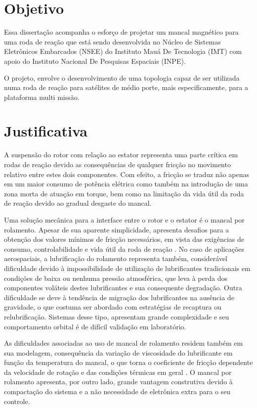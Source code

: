 \section{Objetivo}

Essa dissertação acompanha o esforço de projetar um mancal magnético para uma roda de reação que está sendo desenvolvida no Núcleo de Sistemas Eletrônicos Embarcados (NSEE) do Instituto Mauá De Tecnologia (IMT) com apoio do Instituto Nacional De Pesquisas Espaciais (INPE).

O projeto, envolve o desenvolvimento de uma topologia capaz de ser utilizada numa roda de reação para satélites de médio porte, mais especificamente, para a plataforma multi missão.


\section{Justificativa}

A suspensão do rotor com relação ao estator representa uma parte crítica em rodas de reação \citep{taniwaki2003experimental} devido as consequências de qualquer fricção no movimento relativo entre estes dois componentes. Com efeito, a fricção se traduz não apenas em um maior consumo de potência elétrica como também na introdução de uma zona morta de atuação em torque, bem como na limitação da vida útil da roda de reação devido ao gradual desgaste do mancal.

Uma solução mecânica para a interface entre o rotor e o estator é o mancal por rolamento. Apesar de sua aparente simplicidade, apresenta desafios para a obtenção dos valores mínimos de fricção necessários, em vista das exigências de consumo, controlabilidade e vida útil da roda de reação \citep{Krishnan2010}. No caso de aplicações aerospaciais, a lubrificação do rolamento representa também, considerável dificuldade devido à impossibilidade de utilização de lubrificantes tradicionais em condições de baixa ou nenhuma pressão atmosférica, que leva à perda dos componentes voláteis destes lubrificantes e sua consequente degradação. Outra dificuldade se deve à tendência de migração dos lubrificantes na ausência de gravidade, o que costuma ser abordado com estratégias de recaptura ou relubrificação. Sistemas desse tipo, apresentam grande complexidade e seu comportamento orbital é de difícil validação em laboratório.

As dificuldades associadas ao uso de mancal de rolamento residem também em sua modelagem, consequência da variação de viscosidade do lubrificante em função da temperatura do mancal, o que torna o coeficiente de fricção dependente da velocidade de rotação e das condições térmicas em geral \citep{Carrara2010}. O mancal por rolamento apresenta, por outro lado, grande vantagem construtiva devido à compactação do sistema e a não necessidade de eletrônica extra para o seu controle. 

